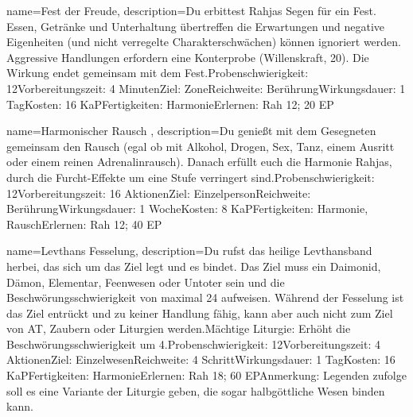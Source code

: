 {
    name={Fest der Freude},
    description={Du erbittest Rahjas Segen für ein Fest. Essen, Getränke und Unterhaltung übertreffen die Erwartungen und negative Eigenheiten (und nicht verregelte Charakterschwächen) können ignoriert werden. Aggressive Handlungen erfordern eine Konterprobe (Willenskraft, 20). Die Wirkung endet gemeinsam mit dem Fest.\newline Probenschwierigkeit: 12\newline Vorbereitungszeit: 4 Minuten\newline Ziel: Zone\newline Reichweite: Berührung\newline Wirkungsdauer: 1 Tag\newline Kosten: 16 KaP\newline Fertigkeiten: Harmonie\newline Erlernen: Rah 12; 20 EP}
}


{
    name={Harmonischer Rausch },
    description={Du genießt mit dem Gesegneten gemeinsam den Rausch (egal ob mit Alkohol, Drogen, Sex, Tanz, einem Ausritt oder einem reinen Adrenalinrausch). Danach erfüllt euch die Harmonie Rahjas, durch die Furcht-Effekte um eine Stufe verringert sind.\newline Probenschwierigkeit: 12\newline Vorbereitungszeit: 16 Aktionen\newline Ziel: Einzelperson\newline Reichweite: Berührung\newline Wirkungsdauer: 1 Woche\newline Kosten: 8 KaP\newline Fertigkeiten: Harmonie, Rausch\newline Erlernen: Rah 12; 40 EP}
}


{
    name={Levthans Fesselung},
    description={Du rufst das heilige Levthansband herbei, das sich um das Ziel legt und es bindet. Das Ziel muss ein Daimonid, Dämon, Elementar, Feenwesen oder Untoter sein und die Beschwörungsschwierigkeit von maximal 24 aufweisen. Während der Fesselung ist das Ziel entrückt und zu keiner Handlung fähig, kann aber auch nicht zum Ziel von AT, Zaubern oder Liturgien werden.\newline Mächtige Liturgie: Erhöht die Beschwörungsschwierigkeit um 4.\newline Probenschwierigkeit: 12\newline Vorbereitungszeit: 4 Aktionen\newline Ziel: Einzelwesen\newline Reichweite: 4 Schritt\newline Wirkungsdauer: 1 Tag\newline Kosten: 16 KaP\newline Fertigkeiten: Harmonie\newline Erlernen: Rah 18; 60 EP\newline Anmerkung: Legenden zufolge soll es eine Variante der Liturgie geben, die sogar halbgöttliche Wesen binden kann. }
}


